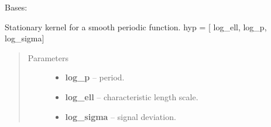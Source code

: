 \documentclass[letterpaper,10pt,english]{sphinxmanual}
\begin{document}

\begin{fulllineitems}
\label{pyGPs.Core:pyGPs.Core.cov.Periodic}
Bases: 

Stationary kernel for a smooth periodic function. 
hyp = {[} log\_ell, log\_p, log\_sigma{]}
\begin{quote}\begin{description}
\item[{Parameters}] \leavevmode\begin{itemize}
\item {} 
\textbf{log\_p} -- period.

\item {} 
\textbf{log\_ell} -- characteristic length scale.

\item {} 
\textbf{log\_sigma} -- signal deviation.

\end{itemize}

\end{description}\end{quote}

\begin{fulllineitems}
\label{pyGPs.Core:pyGPs.Core.cov.Periodic.getCovMatrix}
\end{fulllineitems}


\begin{fulllineitems}
\label{pyGPs.Core:pyGPs.Core.cov.Periodic.getDerMatrix}
\end{fulllineitems}


\end{fulllineitems}

\end{document}
